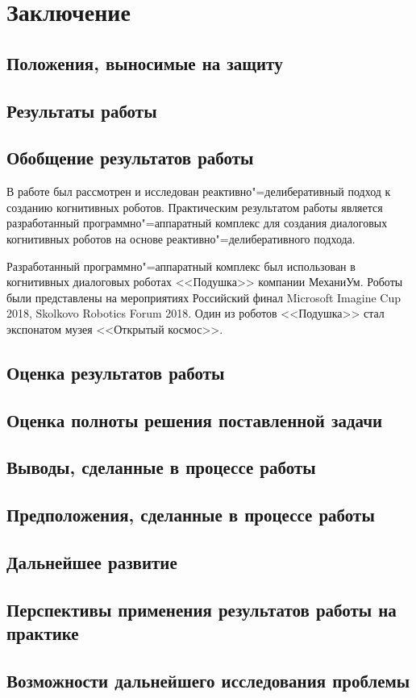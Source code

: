 \chapter{Заключение}
\section{Положения, выносимые на защиту}
\section{Результаты работы}
\section{Обобщение результатов работы}
В работе был рассмотрен и исследован реактивно"=делиберативный подход к созданию когнитивных роботов. Практическим результатом работы является разработанный программно"=аппаратный комплекс для создания диалоговых когнитивных роботов на основе реактивно"=делиберативного подхода. 

Разработанный программно"=аппаратный комплекс был использован в когнитивных диалоговых роботах <<Подушка>> компании МеханиУм. Роботы были представлены на мероприятиях Российский финал Microsoft Imagine Cup 2018, Skolkovo Robotics Forum 2018. Один из роботов <<Подушка>> стал экспонатом музея <<Открытый космос>>. 
\section{Оценка результатов работы}
\section{Оценка полноты решения поставленной задачи}
\section{Выводы, сделанные в процессе работы}
\section{Предположения, сделанные в процессе работы}
\section{Дальнейшее развитие}
\section[Перспективы применения результатов работы \\на практике]{Перспективы применения результатов работы на практике}
\section{Возможности дальнейшего исследования проблемы}
